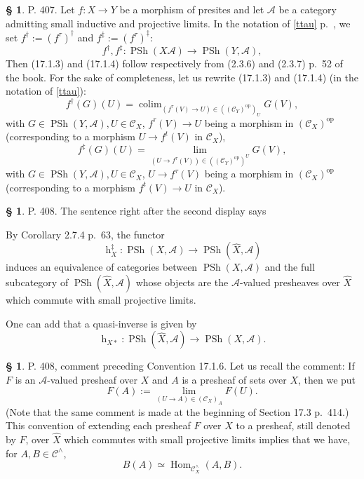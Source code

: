 \documentclass[12pt]{article}%
\newtheorem{prop}[thm]{Proposition}
\theoremstyle{remark}
\theoremstyle{definition}
\newtheorem{s}[thm]{\S}%
\newcommand{\oo}{\operatorname}
\newcommand{\A}{\mathcal A}
\newcommand{\C}{\mathcal C}
\DeclareMathOperator*{\colim}{colim}
\DeclareMathOperator{\Hom}{Hom}%
\DeclareMathOperator{\op}{op}
\DeclareMathOperator{\PSh}{PSh}
\begin{document}
%

\begin{s}\label{fdagger} 
P. 407. Let $f:X\to Y$ be a morphism of presites and let $\A$ be a category admitting small inductive and projective limits. In the notation of \eqref{ttau} p.~\pageref{ttau}, we set $f^\dagger:=(f^\tau)^\dagger$ and $f^\ddagger:=(f^\tau)^\ddagger$: 
$$
f^\dagger,f^\ddagger:\PSh(X\A)\to\PSh(Y,\A),
$$
Then (17.1.3) and (17.1.4) follow respectively from (2.3.6) and (2.3.7) p.~52 of the book. For the sake of completeness, let us rewrite (17.1.3) and (17.1.4) (in the notation of \eqref{ttau}):
%
\begin{equation}\label{1713}
f^\dagger(G)(U)=\colim_{(f^\tau(V)\to U)\in((\C_Y)^{\op})_U}G(V),
\end{equation}
%
with $G\in\PSh(Y,\A),U\in\C_X$, $f^\tau(V)\to U$ being a morphism in $(\C_X)^{\op}$ (corresponding to a morphism $U\to f^t(V)$ in $\C_X$), 
%
\begin{equation}\label{1714}
f^\ddagger(G)(U)=\lim_{(U\to f^\tau(V))\in((\C_Y)^{\op})^U}G(V),
\end{equation}
%
with $G\in\PSh(Y,\A),U\in\C_X$, $U\to f^\tau(V)$ being a morphism in $(\C_X)^{\op}$ (corresponding to a morphism $f^t(V)\to U$ in $\C_X$).

\end{s}

%

\begin{s}
P. 408. The sentence right after the second display says 

By Corollary 2.7.4 p.~63, the functor 
$$
\oo h_X^\ddagger:\oo{PSh}(X,\A)\to\oo{PSh}(\widehat X,\A)
$$ 
induces an equivalence of categories between $\oo{PSh}(X,\A)$ and the full subcategory of $\oo{PSh}(\widehat X,\A)$ whose objects are the $\A$-valued presheaves over $\widehat X$ which commute with small projective limits. 

One can add that a quasi-inverse is given by 
$$
\oo h_{X*}:\oo{PSh}(\widehat X,\A)\to\oo{PSh}(X,\A). 
$$ 
\end{s}

%

\begin{s}\label{s408}
P. 408, comment preceding Convention 17.1.6. Let us recall the comment: If $F$ is an $\A$-valued presheaf over $X$ and $A$ is a presheaf of sets over $X$, then we put 
\begin{equation}\label{408}
F(A):=\lim_{(U\to A)\in(\C_X)_A}F(U).
\end{equation}
(Note that the same comment is made at the beginning of Section 17.3 p.~414.) This convention of extending each presheaf $F$ over $X$ to a presheaf, still denoted by $F$, over $\widehat X$ which commutes with small projective limits implies that we have, for $A,B\in\C^\wedge$, 
$$
B(A)\simeq\Hom_{\C_X^\wedge}(A,B).
$$
\end{s}
\end{document}

